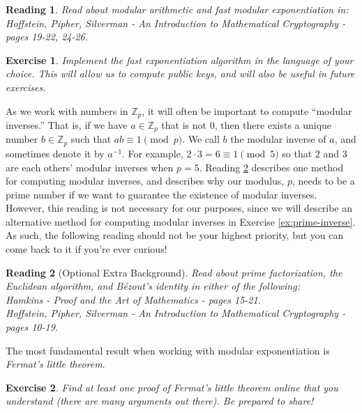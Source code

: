 \documentclass[12pt]{article}
\newcommand{\Z}[0]{\mathbb{Z}}
\newtheorem{exercise}{Exercise}
\newtheorem{reading}{Reading}
\theoremstyle{definition}
\theoremstyle{remark}
\theoremstyle{definition}
\begin{document}
\begin{reading}\label{modular}
Read about modular arithmetic and fast modular exponentiation in:\\
Hoffstein, Pipher, Silverman - An Introduction to Mathematical Cryptography - pages 19-22, 24-26.
\end{reading}

\begin{exercise}\label{ex:Fast-Exp}
Implement the fast exponentiation algorithm in the language of your choice. This will allow us to compute public keys, and will also be useful in future exercises.
\end{exercise}

As we work with numbers in $\Z_p$, it will often be important to compute ``modular inverses.'' That is, if we have $a\in\Z_p$ that is not $0$, then there exists a unique number $b\in\Z_p$ such that $ab \equiv 1\pmod p$. We call $b$ the modular inverse of $a$, and sometimes denote it by $a^{-1}$. For example, $2\cdot 3 = 6\equiv 1\pmod 5$ so that $2$ and $3$ are each others' modular inverses when $p=5$. Reading \ref{euclidean-background} describes one method for computing modular inverses, and describes why our modulus, $p$, needs to be a prime number if we want to guarantee the existence of modular inverses. However, this reading is not necessary for our purposes, since we will describe an alternative method for computing modular inverses in Exercise \ref{ex:prime-inverse}. As such, the following reading should not be your highest priority, but you can come back to it if you're ever curious!

\begin{reading}[Optional Extra Background]\label{euclidean-background}
Read about prime factorization, the Euclidean algorithm, and B{\'e}zout's identity in either of the following:\\
Hamkins - Proof and the Art of Mathematics - pages 15-21.\\
Hoffstein, Pipher, Silverman - An Introduction to Mathematical Cryptography - pages 10-19.
\end{reading}

The most fundamental result when working with modular exponentiation is \emph{Fermat's little theorem}.

\begin{exercise}\label{ex:FLT}
Find at least one proof of Fermat’s little theorem online that you understand (there are many arguments out there). Be prepared to share!
\end{exercise}
\end{document}
